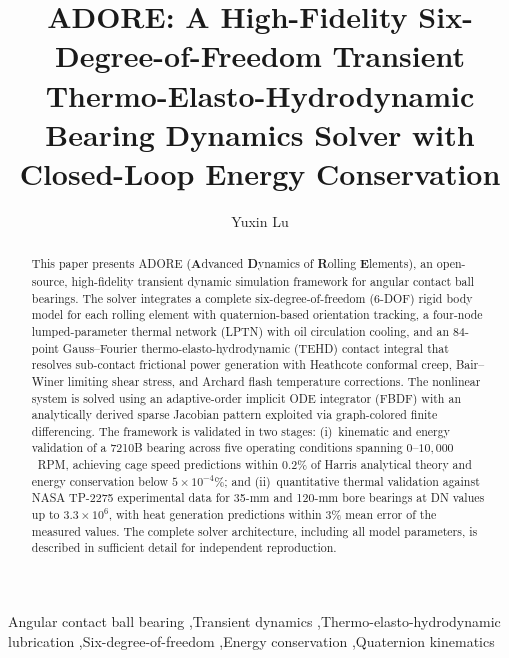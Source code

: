 \documentclass[preprint,12pt]{elsarticle}
\begin{document}
\begin{frontmatter}

\title{ADORE: A High-Fidelity Six-Degree-of-Freedom Transient Thermo-Elasto-Hydrodynamic Bearing Dynamics Solver with Closed-Loop Energy Conservation}

\author[addr1]{Yuxin Lu}

\address[addr1]{School of Mechanical Engineering, University, China}

\begin{abstract}
This paper presents ADORE (\textbf{A}dvanced \textbf{D}ynamics of \textbf{R}olling \textbf{E}lements), an open-source, high-fidelity transient dynamic simulation framework for angular contact ball bearings. The solver integrates a complete six-degree-of-freedom (6-DOF) rigid body model for each rolling element with quaternion-based orientation tracking, a four-node lumped-parameter thermal network (LPTN) with oil circulation cooling, and an 84-point Gauss--Fourier thermo-elasto-hydrodynamic (TEHD) contact integral that resolves sub-contact frictional power generation with Heathcote conformal creep, Bair--Winer limiting shear stress, and Archard flash temperature corrections. The nonlinear system is solved using an adaptive-order implicit ODE integrator (FBDF) with an analytically derived sparse Jacobian pattern exploited via graph-colored finite differencing. The framework is validated in two stages: (i)~kinematic and energy validation of a 7210B bearing across five operating conditions spanning $0$--$10{,}000$~RPM, achieving cage speed predictions within $0.2\%$ of Harris analytical theory and energy conservation below $5 \times 10^{-4}\%$; and (ii)~quantitative thermal validation against NASA TP-2275 experimental data for 35-mm and 120-mm bore bearings at DN values up to $3.3 \times 10^6$, with heat generation predictions within $3\%$ mean error of the measured values. The complete solver architecture, including all model parameters, is described in sufficient detail for independent reproduction.
\end{abstract}

\begin{keyword}
Angular contact ball bearing \sep Transient dynamics \sep Thermo-elasto-hydrodynamic lubrication \sep Six-degree-of-freedom \sep Energy conservation \sep Quaternion kinematics
\end{keyword}

\end{frontmatter}
\end{document}
